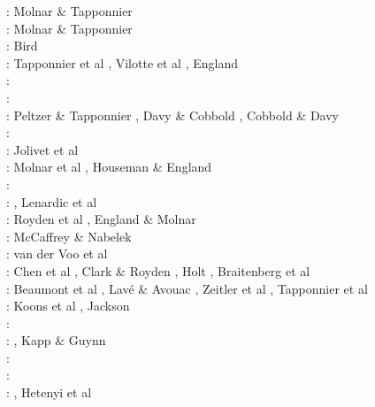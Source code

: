 \begin{itemize}
\begin{scriptsize}
\nineteenseventyfive: Molnar \& Tapponnier \cite{mota75}\\
\nineteenseventyseven:  Molnar \& Tapponnier \cite{mota77}\\
\nineteenseventyeight: Bird \cite{bird78}\\
\nineteeneightytwo: Tapponnier et al \cite{tapl82}, Vilotte et al \cite{vidm82}, England \cite{engl82}\\
\nineteeneightyfour: \cite{vidm84}\\
\nineteeneightysix: \cite{vimd86}\cite{moln86}\cite{enho86}\\
\nineteeneightyeight: Peltzer \& Tapponnier \cite{peta88}, Davy \& Cobbold \cite{daco88}, 
                      Cobbold \& Davy \cite{coda88}\\
\nineteeneightynine: \cite{moln89}\\
\nineteenninety: Jolivet et al \cite{jodc90}\\
\nineteenninetythree: Molnar et al \cite{moem93}, Houseman \& England \cite{hoen93}\\
\nineteenninetyfour: \cite{wibe94}\\
\nineteenninetyfive: \cite{chmm95}, Lenardic et al \cite{leka95}\\
\nineteenninetyseven: Royden et al \cite{robk97}, England \& Molnar \cite{enmo97}\\
\nineteenninetyeight: McCaffrey \& Nabelek \cite{mcna98}\\
\nineteenninetynine: van der Voo et al \cite{vasb99}\\
\twothousand: Chen et al \cite{chbl00}, Clark \& Royden \cite{clro00}, Holt \cite{holt00},
              Braitenberg et al \cite{brzf00}\\
\twothousandone: Beaumont et al \cite{bejn01}, Lav{\'e} \& Avouac \cite{laav01}, Zeitler et al \cite{zemk01}, 
                 Tapponnier et al \cite{tazr01}\\
\twothousandtwo: Koons et al \cite{kozc02}, Jackson \cite{jack02}\\
\twothousandthree: \cite{reta03}\\
\twothousandfour: \cite{bejn04}\cite{jabm04}\cite{zhsw04}\cite{rekv04}, Kapp \& Guynn \cite{kagu04}\\
\twothousandfive: \cite{clbr05}\cite{rost05a}\cite{rost05b}\\
\twothousandsix: \cite{clrw06}\cite{jabn06}\cite{golc06}\\
\twothousandseven: \cite{mead07}, Hetenyi et al \cite{hecb07}\\

\end{scriptsize}
\end{itemize}
